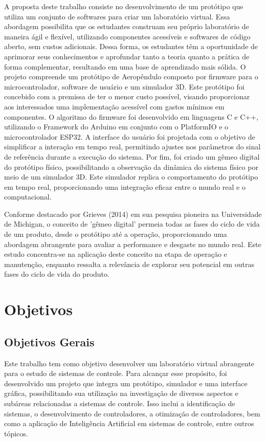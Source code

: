 A proposta deste trabalho consiste no desenvolvimento de um protótipo que utiliza um conjunto de softwares para criar um laboratório virtual. Essa abordagem possibilita que os estudantes construam seu próprio laboratório de maneira ágil e flexível, utilizando componentes acessíveis e softwares de código aberto, sem custos adicionais. Dessa forma, os estudantes têm a oportunidade de aprimorar seus conhecimentos e aprofundar tanto a teoria quanto a prática de forma complementar, resultando em uma base de aprendizado mais sólida. O projeto compreende um protótipo de Aeropêndulo composto por firmware para o microcontrolador, software de usuário e um simulador 3D. Este protótipo foi concebido com a premissa de ter o menor custo possível, visando proporcionar aos interessados uma implementação acessível com gastos mínimos em componentes. O algoritmo do firmware foi desenvolvido em linguagens C e C++, utilizando o Framework do Arduino em conjunto com o PlatformIO e o microcontrolador ESP32. A interface do usuário foi projetada com o objetivo de simplificar a interação em tempo real, permitindo ajustes nos parâmetros do sinal de referência durante a execução do sistema. Por fim, foi criado um gêmeo digital do protótipo físico, possibilitando a observação da dinâmica do sistema físico por meio de um simulador 3D. Este simulador replica o comportamento do protótipo em tempo real, proporcionando uma integração eficaz entre o mundo real e o computacional.

Conforme destacado por Grieves (2014) em sua pesquisa pioneira na Universidade de Michigan, o conceito de 'gêmeo digital' permeia todas as fases do ciclo de vida de um produto, desde o protótipo até a operação, proporcionando uma abordagem abrangente para avaliar a performance e desgaste no mundo real. Este estudo concentra-se na aplicação deste conceito na etapa de operação e manutenção, enquanto ressalta a relevância de explorar seu potencial em outras fases do ciclo de vida do produto\cite{quinalha2018gemeos}.


\section{Objetivos}

\subsection{Objetivos Gerais}

Este trabalho tem como objetivo desenvolver um laboratório virtual abrangente para o estudo de sistemas de controle. Para alcançar esse propósito, foi desenvolvido um projeto que integra um protótipo, simulador e uma interface gráfica, possibilitando sua utilização na investigação de diversos aspectos e subáreas relacionadas a sistemas de controle. Isso inclui a identificação de sistemas, o desenvolvimento de controladores, a otimização de controladores, bem como a aplicação de Inteligência Artificial em sistemas de controle, entre outros tópicos.

